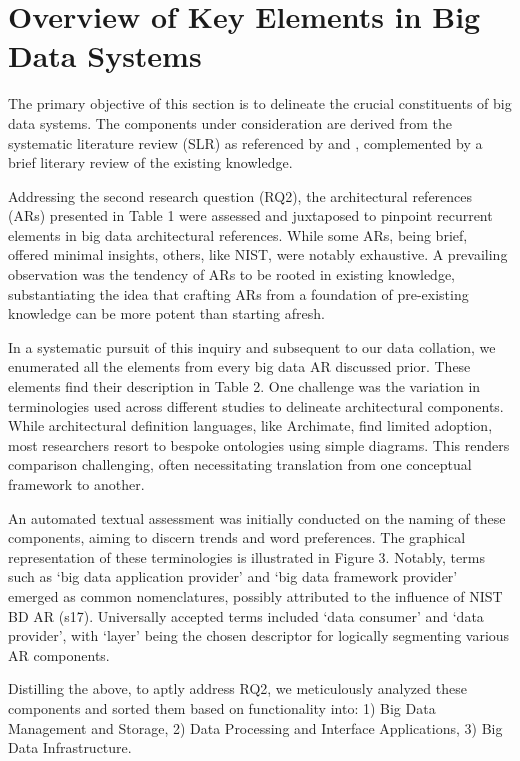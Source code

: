 \documentclass[conference]{IEEEtran}
\begin{document}
\section{Overview of Key Elements in Big Data Systems}

The primary objective of this section is to delineate the crucial constituents of big data systems. The components under consideration are derived from the systematic literature review (SLR) as referenced by \cite{b1} and \cite{b2}, complemented by a brief literary review of the existing knowledge.

Addressing the second research question (RQ2), the architectural references (ARs) presented in Table 1 were assessed and juxtaposed to pinpoint recurrent elements in big data architectural references. While some ARs, being brief, offered minimal insights, others, like NIST, were notably exhaustive. A prevailing observation was the tendency of ARs to be rooted in existing knowledge, substantiating the idea that crafting ARs from a foundation of pre-existing knowledge can be more potent than starting afresh.

In a systematic pursuit of this inquiry and subsequent to our data collation, we enumerated all the elements from every big data AR discussed prior. These elements find their description in Table 2. One challenge was the variation in terminologies used across different studies to delineate architectural components. While architectural definition languages, like Archimate, find limited adoption, most researchers resort to bespoke ontologies using simple diagrams. This renders comparison challenging, often necessitating translation from one conceptual framework to another.

An automated textual assessment was initially conducted on the naming of these components, aiming to discern trends and word preferences. The graphical representation of these terminologies is illustrated in Figure 3. Notably, terms such as ‘big data application provider’ and ‘big data framework provider’ emerged as common nomenclatures, possibly attributed to the influence of NIST BD AR (s17). Universally accepted terms included ‘data consumer’ and ‘data provider’, with ‘layer’ being the chosen descriptor for logically segmenting various AR components.

Distilling the above, to aptly address RQ2, we meticulously analyzed these components and sorted them based on functionality into: 1) Big Data Management and Storage, 2) Data Processing and Interface Applications, 3) Big Data Infrastructure.
\end{document}
